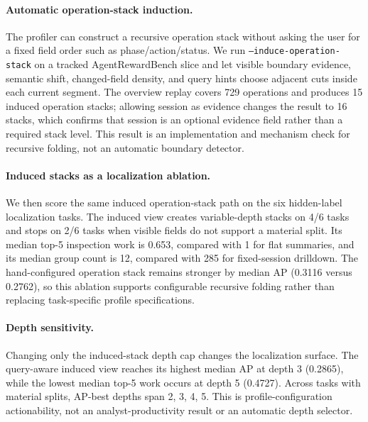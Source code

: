 \paragraph{Automatic operation-stack induction.}
The profiler can construct a recursive operation stack without asking the user for a fixed field order such as phase/action/status.
We run \texttt{--induce-operation-stack} on a tracked AgentRewardBench slice and let visible boundary evidence, semantic shift, changed-field density, and query hints choose adjacent cuts inside each current segment.
The overview replay covers 729 operations and produces 15 induced operation stacks; allowing session as evidence changes the result to 16 stacks, which confirms that session is an optional evidence field rather than a required stack level.
This result is an implementation and mechanism check for recursive folding, not an automatic boundary detector.

\paragraph{Induced stacks as a localization ablation.}
We then score the same induced operation-stack path on the six hidden-label localization tasks.
The induced view creates variable-depth stacks on 4/6 tasks and stops on 2/6 tasks when visible fields do not support a material split.
Its median top-5 inspection work is 0.653, compared with 1 for flat summaries, and its median group count is 12, compared with 285 for fixed-session drilldown.
The hand-configured operation stack remains stronger by median AP (0.3116 versus 0.2762), so this ablation supports configurable recursive folding rather than replacing task-specific profile specifications.

\paragraph{Depth sensitivity.}
Changing only the induced-stack depth cap changes the localization surface.
The query-aware induced view reaches its highest median AP at depth 3 (0.2865), while the lowest median top-5 work occurs at depth 5 (0.4727).
Across tasks with material splits, AP-best depths span 2, 3, 4, 5.
This is profile-configuration actionability, not an analyst-productivity result or an automatic depth selector.
